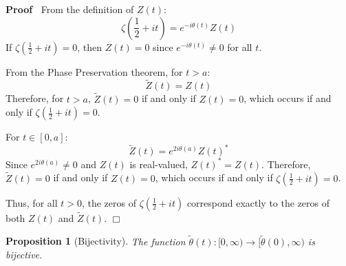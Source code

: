\documentclass{article}
\newenvironment{proof}{\noindent\textbf{Proof\ }}{\hspace*{\fill}$\Box$\medskip}
\newtheorem{proposition}{Proposition}
\begin{document}
\begin{proof}
  From the definition of $Z (t)$:
  \begin{equation}
    \zeta \left( \frac{1}{2} + it \right) = e^{- i \theta (t)} Z (t)
  \end{equation}
  If $\zeta (\frac{1}{2} + it) = 0$, then $Z (t) = 0$ since $e^{- i \theta
  (t)} \neq 0$ for all $t$.
  
  From the Phase Preservation theorem, for $t > a$:
  \begin{equation}
    \tilde{Z} (t) = Z (t)
  \end{equation}
  Therefore, for $t > a$, $\tilde{Z} (t) = 0$ if and only if $Z (t) = 0$,
  which occurs if and only if $\zeta (\frac{1}{2} + it) = 0$.
  
  For $t \in [0, a]$:
  \begin{equation}
    \tilde{Z} (t) = e^{2 i \theta (a)} Z (t)^{\ast}
  \end{equation}
  Since $e^{2 i \theta (a)} \neq 0$ and $Z (t)$ is real-valued, $Z (t)^{\ast}
  = Z (t)$. Therefore, $\tilde{Z} (t) = 0$ if and only if $Z (t) = 0$, which
  occurs if and only if $\zeta (\frac{1}{2} + it) = 0$.
  
  Thus, for all $t > 0$, the zeros of $\zeta (\frac{1}{2} + it)$ correspond
  exactly to the zeros of both $Z (t)$ and $\tilde{Z} (t)$.
\end{proof}

\begin{proposition}[Bijectivity]
  The function $\tilde{\theta} (t) : [0, \infty) \to [\tilde{\theta} (0),
  \infty)$ is bijective.
\end{proposition}
\end{document}
